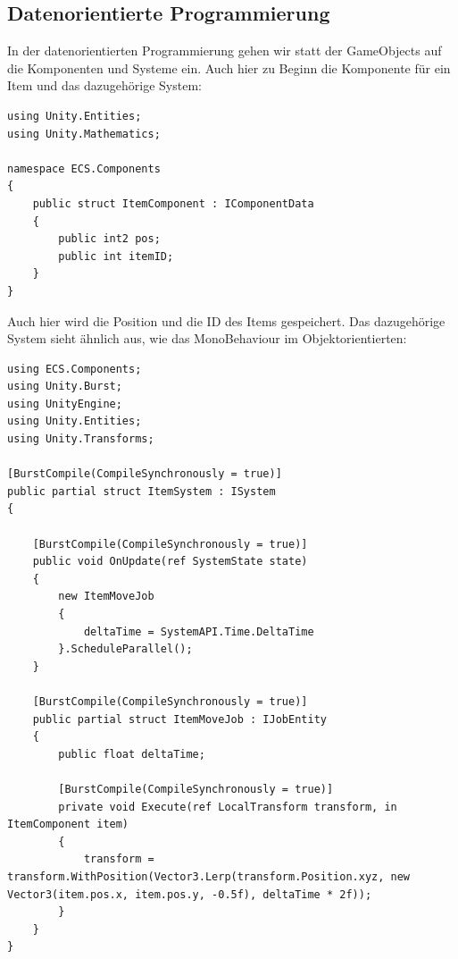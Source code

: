 \documentclass[12pt, titlepage]{article}
\begin{document}
\subsection{Datenorientierte Programmierung}
In der datenorientierten Programmierung gehen wir statt der GameObjects auf die Komponenten und Systeme ein. Auch hier zu Beginn die Komponente für ein Item und das dazugehörige System:
\begin{lstlisting}[style=code, caption={Item Komponente ECS}]
using Unity.Entities;
using Unity.Mathematics;

namespace ECS.Components
{
    public struct ItemComponent : IComponentData
    {
        public int2 pos;
        public int itemID;
    }
}
\end{lstlisting}
Auch hier wird die Position und die ID des Items gespeichert. Das dazugehörige System sieht ähnlich aus, wie das MonoBehaviour im Objektorientierten:
\begin{lstlisting}[style=code, caption={Item System}]
using ECS.Components;
using Unity.Burst;
using UnityEngine;
using Unity.Entities;
using Unity.Transforms;

[BurstCompile(CompileSynchronously = true)]
public partial struct ItemSystem : ISystem
{
    
    [BurstCompile(CompileSynchronously = true)]
    public void OnUpdate(ref SystemState state)
    {
        new ItemMoveJob
        {
            deltaTime = SystemAPI.Time.DeltaTime
        }.ScheduleParallel();
    }

    [BurstCompile(CompileSynchronously = true)]
    public partial struct ItemMoveJob : IJobEntity
    {
        public float deltaTime;
        
        [BurstCompile(CompileSynchronously = true)]
        private void Execute(ref LocalTransform transform, in ItemComponent item)
        {
            transform = transform.WithPosition(Vector3.Lerp(transform.Position.xyz, new Vector3(item.pos.x, item.pos.y, -0.5f), deltaTime * 2f));
        }
    }
}
\end{lstlisting}
\end{document}
